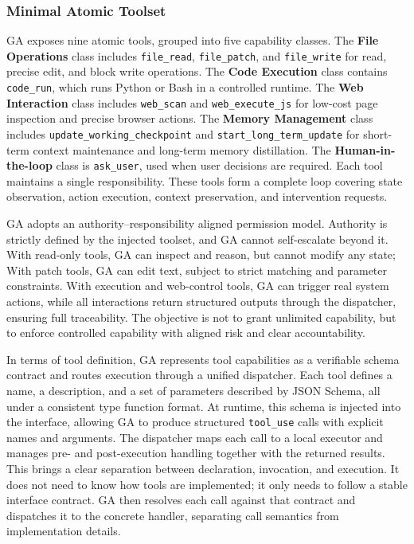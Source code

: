\subsubsection{Minimal Atomic Toolset}
\label{sec:tools}

GA exposes nine atomic tools, grouped into five capability classes.  
The \textbf{File Operations} class includes \texttt{file\_read}, \texttt{file\_patch}, and \texttt{file\_write} for read, precise edit, and block write operations.  
The \textbf{Code Execution} class contains \texttt{code\_run}, which runs Python or Bash in a controlled runtime.  
The \textbf{Web Interaction} class includes \texttt{web\_scan} and \texttt{web\_execute\_js} for low-cost page inspection and precise browser actions.  
The \textbf{Memory Management} class includes \texttt{update\_working\_checkpoint} and \texttt{start\_long\_term\_update} for short-term context maintenance and long-term memory distillation.  
The \textbf{Human-in-the-loop} class is \texttt{ask\_user}, used when user decisions are required. 
Each tool maintains a single responsibility.
These tools form a complete loop covering state observation, action execution, context preservation, and intervention requests.

GA adopts an authority–responsibility aligned permission model.
Authority is strictly defined by the injected toolset, and GA cannot self-escalate beyond it.
With read-only tools, GA can inspect and reason, but cannot modify any state;
With patch tools, GA can edit text, subject to strict matching and parameter constraints.
With execution and web-control tools, GA can trigger real system actions, while all interactions return structured outputs through the dispatcher, ensuring full traceability.
The objective is not to grant unlimited capability, but to enforce controlled capability with aligned risk and clear accountability.

In terms of tool definition, GA represents tool capabilities as a verifiable schema contract and routes execution through a unified dispatcher.
Each tool defines a name, a description, and a set of parameters described by JSON Schema, all under a consistent type function format.
At runtime, this schema is injected into the interface, allowing GA to produce structured \texttt{tool\_use} calls with explicit names and arguments.
The dispatcher maps each call to a local executor and manages pre- and post-execution handling together with the returned results.
This brings a clear separation between declaration, invocation, and execution. 
It does not need to know how tools are implemented; it only needs to follow a stable interface contract.
GA then resolves each call against that contract and dispatches it to the concrete handler, separating call semantics from implementation details.



